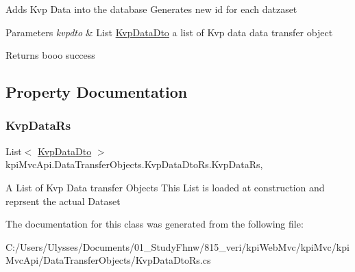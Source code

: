 Adds Kvp Data into the database Generates new id for each datzaset 


\begin{DoxyParams}{Parameters}
{\em kvpdto} & {\ttfamily  List \hyperlink{classkpi_mvc_api_1_1_data_transfer_objects_1_1_kvp_data_dto}{Kvp\+Data\+Dto} } a list of Kvp data data transfer object \\
\hline
\end{DoxyParams}
\begin{DoxyReturn}{Returns}
{\ttfamily booo} success
\end{DoxyReturn}


\subsection{Property Documentation}
\mbox{\label{classkpi_mvc_api_1_1_data_transfer_objects_1_1_kvp_data_dto_rs_ae32122a6aba038291afde6128898487e}} 
\subsubsection{\texorpdfstring{Kvp\+Data\+Rs}{KvpDataRs}}
{\footnotesize\ttfamily List$<$ \hyperlink{classkpi_mvc_api_1_1_data_transfer_objects_1_1_kvp_data_dto}{Kvp\+Data\+Dto} $>$ kpi\+Mvc\+Api.\+Data\+Transfer\+Objects.\+Kvp\+Data\+Dto\+Rs.\+Kvp\+Data\+Rs\hspace{0.3cm}{\ttfamily [get]}, {\ttfamily [set]}}



A List of Kvp Data transfer Objects This List is loaded at construction and reprsent the actual Dataset 



The documentation for this class was generated from the following file\+:\begin{DoxyCompactItemize}
\item 
C\+:/\+Users/\+Ulysses/\+Documents/01\+\_\+\+Study\+Fhnw/815\+\_\+veri/kpi\+Web\+Mvc/kpi\+Mvc/kpi\+Mvc\+Api/\+Data\+Transfer\+Objects/Kvp\+Data\+Dto\+Rs.\+cs\end{DoxyCompactItemize}
